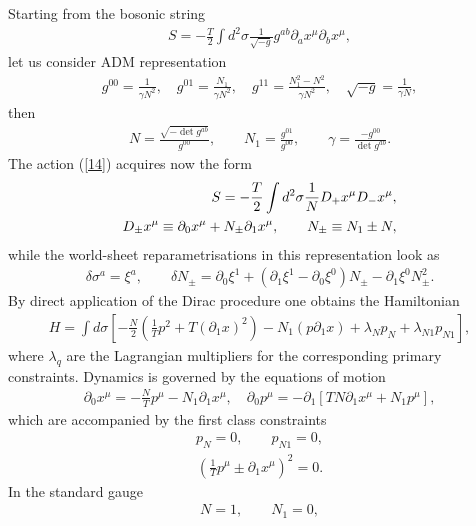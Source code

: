 \documentclass[a4paper]{article}
\begin{document}
Starting from the bosonic string 
\begin{eqnarray}\label{14}
S=-\frac{T}{2}\int d^2\sigma
\frac{1}{\sqrt{-g}}g^{ab}
\partial_ax^\mu \partial_bx^\mu,
\end{eqnarray}
let us consider ADM representation
\begin{eqnarray}\label{15}
g^{00}=\frac{1}{\gamma N^2}, \quad g^{01}=\frac{N_1}{\gamma N^2}, \quad 
g^{11}=\frac{N_1^2-N^2}{\gamma N^2}, \quad 
\sqrt{-g}=\frac{1}{\gamma N}, 
\end{eqnarray}
then
\begin{eqnarray}\label{16}
N=\frac{\sqrt{-\det{g^{ab}}}}{g^{00}}, \qquad 
N_1=\frac{g^{01}}{g^{00}}, \qquad 
\gamma=\frac{-g^{00}}{\det{g^{ab}}}.
\end{eqnarray}
The action (\ref{14}) acquires now the form
\begin{eqnarray}\label{17}
S=-\frac{T}{2}\int d^2\sigma\frac{1}{N}
D_+x^\mu D_-x^\mu, \cr
D_{\pm}x^\mu\equiv\partial_0x^\mu+N_{\pm}\partial_1x^\mu, \qquad 
N_{\pm}\equiv N_1\pm N, 
\end{eqnarray}
while the world-sheet reparametrisations in this representation look as 
\begin{eqnarray}\label{18}
\delta\sigma^a=\xi^a, \qquad \delta N_{\pm}=\partial_0\xi^1+
(\partial_1\xi^1-
\partial_0\xi^0)N_{\pm}-\partial_1\xi^0N_{\pm}^2.
\end{eqnarray}
By direct application of the Dirac procedure one obtains the Hamiltonian 
\begin{eqnarray}\label{19}
H=\int d\sigma\left[-\frac N2\left(\frac {1}{T} p^2+
T(\partial_1 x)^2\right)-N_1(p\partial_1 x)+
\lambda_N p_N+\lambda_{N1}p_{N1}\right],
\end{eqnarray}
where $\lambda_q$ are the Lagrangian multipliers for the corresponding 
primary constraints. Dynamics is governed by the equations of motion
\begin{eqnarray}\label{20}
\partial_0x^\mu=-\frac{N}{T}p^\mu-N_1\partial_1x^\mu, \quad 
\partial_0p^\mu=-\partial_1[TN\partial_1x^\mu+N_1p^\mu],
\end{eqnarray}
which are accompanied by the first class constraints
\begin{eqnarray}\label{21}
p_N=0, \qquad p_{N1}=0,
\end{eqnarray}
\begin{eqnarray}\label{22}
(\frac{1}{T}p^\mu\pm\partial_1x^\mu)^2=0.
\end{eqnarray}
In the standard gauge 
\begin{eqnarray}\label{23}
N=1, \qquad N_1=0,
\end{eqnarray}
\end{document}
